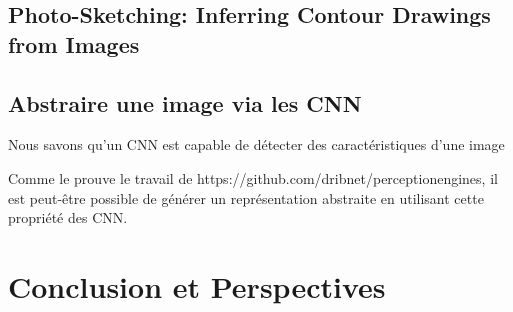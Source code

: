 \documentclass[a4paper, 12pt]{book}
\begin{document}
\section{Photo-Sketching: Inferring Contour Drawings from Images}


\section{Abstraire une image via les CNN}
Nous savons qu'un CNN est capable de détecter des caractéristiques d'une image


Comme le prouve le travail de https://github.com/dribnet/perceptionengines, il est peut-être possible de générer un représentation abstraite en utilisant cette propriété des CNN.


\chapter{Conclusion et Perspectives\label{chap-conclusion}}



\end{document}

